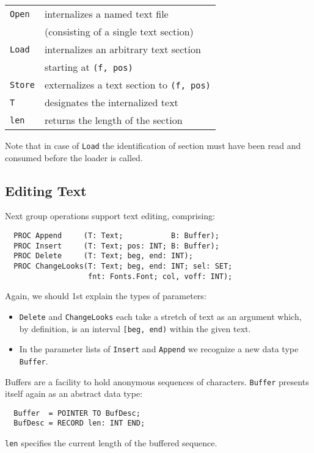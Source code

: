 \begin{table}[h!]
  \begin{tabular}{l l}
    \verb|Open|  & internalizes a named text file \\
                 & (consisting of a single text section) \\
    \verb|Load|  & internalizes an arbitrary text section \\
                 & starting at \verb|(f, pos)| \\
    \verb|Store| & externalizes a text section to \verb|(f, pos)| \\
    \verb|T|     & designates the internalized text \\
    \verb|len|   & returns the length of the section
  \end{tabular}
\end{table}
Note that in case of \verb|Load| the identification of section
must have been read and consumed before the loader is called.

\subsection{Editing Text}
Next group operations support text editing, comprising:
\begin{verbatim}
  PROC Append     (T: Text;           B: Buffer);
  PROC Insert     (T: Text; pos: INT; B: Buffer);
  PROC Delete     (T: Text; beg, end: INT);
  PROC ChangeLooks(T: Text; beg, end: INT; sel: SET;
                   fnt: Fonts.Font; col, voff: INT);
\end{verbatim}
Again, we should 1st explain the types of parameters:
\begin{itemize}
  \item \verb|Delete| and \verb|ChangeLooks| each take a stretch of text as an argument which,
    by definition, is an interval \verb|[beg, end)| within the given text.
  \item In the parameter lists of \verb|Insert| and \verb|Append|
    we recognize a new data type \verb|Buffer|.
\end{itemize}
Buffers are a facility to hold anonymous sequences of characters.
\verb|Buffer| presents itself again as an abstract data type:
\begin{verbatim}
  Buffer  = POINTER TO BufDesc;
  BufDesc = RECORD len: INT END;
\end{verbatim}
\verb|len| specifies the current length of the buffered sequence.

